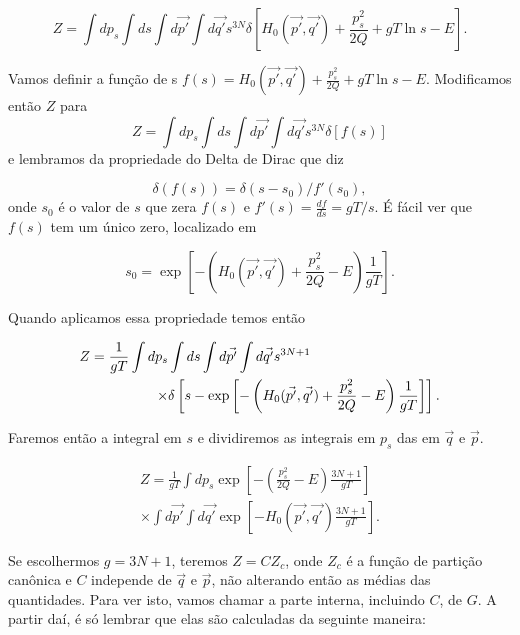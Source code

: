 \documentclass[twoside, a4paper]{scrartcl}
\newcommand{\deri}[2]{\frac{d #1}{d #2}}
\begin{document}
\begin{equation}
	Z = \int dp_s \int ds \int d\vec{p'} \int d\vec{q'} s^{3N}\delta\left[H_0(\vec{p'}, \vec{q'}) + \frac{p_s^2}{2Q} + gT \ln s -E \right].
\end{equation}

Vamos definir a função de s $f(s) = H_0(\vec{p'}, \vec{q'}) + \frac{p_s^2}{2Q} + gT \ln s -E$. Modificamos então $Z$ para
\begin{equation}
	Z = \int dp_s \int ds \int d\vec{p'} \int d\vec{q'} s^{3N}\delta\left[f(s)\right]
\end{equation}
e lembramos da propriedade do Delta de Dirac que diz

\begin{equation}
	\delta(f(s)) = \delta(s-s_0)/f'(s_0),
\end{equation}
onde $s_0$ é o valor de $s$ que zera $f(s)$ e $f'(s) = \deri{f}{s} = gT/s$. É fácil ver que $f(s)$ tem um único zero, localizado em

\begin{equation}
	s_0 = \exp\left[-\left( H_0(\vec{p'}, \vec{q'}) + \frac{p_s^2}{2Q} -E\right)\frac{1}{gT}\right].
\end{equation}

Quando aplicamos essa propriedade temos então

\begin{align}
	Z = \frac{1}{gT} \int dp_s & \int ds \int d\vec{p'} \int d\vec{q'} s^{3N+1}  \notag \\ 
	   \times&\delta\left[s - \exp\left[-\left( H_0(\vec{p'}, \vec{q'}) + \frac{p_s^2}{2Q} -E\right)\frac{1}{gT}\right]\right].
\end{align}

Faremos então a integral em $s$ e dividiremos as integrais em $p_s$ das em $\vec{q}$ e $\vec{p}$.

\begin{align}
	Z = \frac{1}{gT} \int dp_s \exp\left[-\left( \frac{p_s^2}{2Q} - E\right)\frac{3N+1}{gT}\right] \\
	\times \int d\vec{p'} \int d\vec{q'} \exp\left[-H_0(\vec{p'}, \vec{q'}) \frac{3N+1}{gT}\right].
\end{align}

Se escolhermos $g=3N+1$, teremos $Z=C Z_c$, onde $Z_c$ é a função de partição canônica e $C$ independe de $\vec{q}$ e $\vec{p}$, não alterando então as médias das quantidades. Para ver isto, vamos chamar a parte interna, incluindo $C$, de $G$. A partir daí, é só lembrar que elas são calculadas da seguinte maneira:
\end{document}
